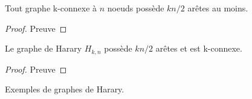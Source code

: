 \begin{mytheo}  
  Tout graphe k-connexe à $n$ noeuds possède $kn/2$ arêtes au moins.
  \begin{proof}
     Preuve
  \end{proof}
\end{mytheo}

\begin{mytheo}  
  Le graphe de Harary $H_{k ,n}$ possède $kn/2$ arêtes et est k-connexe.
  \begin{proof}
     Preuve
  \end{proof}
\end{mytheo}

\begin{myexem}
  Exemples de graphes de Harary.
\end{myexem}



